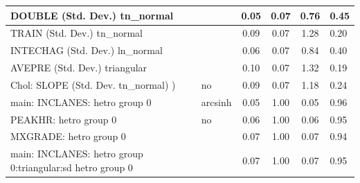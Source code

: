 \begin{table}
\begin{center}
\begin{tabular}{|l|l|c|c|c|l|}
			\hline
			DOUBLE (Std. Dev.) tn_normal &  & 0.05 & 0.07 & 0.76 & 0.45 \\
			\hline
			TRAIN (Std. Dev.) tn_normal &  & 0.09 & 0.07 & 1.28 & 0.20 \\
			\hline
			INTECHAG (Std. Dev.) ln_normal &  & 0.06 & 0.07 & 0.84 & 0.40 \\
			\hline
			AVEPRE (Std. Dev.) triangular &  & 0.10 & 0.07 & 1.32 & 0.19 \\
			\hline
			 Chol: SLOPE (Std. Dev. tn_normal) ) & no & 0.09 & 0.07 & 1.18 & 0.24 \\
			\hline
			main: INCLANES: hetro group 0 & arcsinh & 0.05 & 1.00 & 0.05 & 0.96 \\
			\hline
			PEAKHR: hetro group 0 & no & 0.06 & 1.00 & 0.06 & 0.95 \\
			\hline
			MXGRADE: hetro group 0 &  & 0.07 & 1.00 & 0.07 & 0.94 \\
			\hline
			main: INCLANES: hetro group 0:triangular:sd  hetro group 0 &  & 0.07 & 1.00 & 0.07 & 0.95 \\
			\hline
		\end{tabular}
	\end{center}
\end{table}